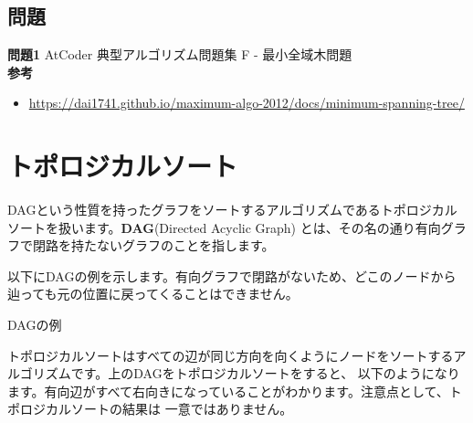 \subsection{問題}

\textbf{問題1} AtCoder 典型アルゴリズム問題集 F - 最小全域木問題\\

\textbf{参考}
\begin{itemize}
  \item \url{https://dai1741.github.io/maximum-algo-2012/docs/minimum-spanning-tree/}
\end{itemize}

\newpage

\section{トポロジカルソート}
DAGという性質を持ったグラフをソートするアルゴリズムであるトポロジカルソートを扱います。\textbf{DAG}(Directed Acyclic Graph)
とは、その名の通り有向グラフで閉路を持たないグラフのことを指します。

以下にDAGの例を示します。有向グラフで閉路がないため、どこのノードから辿っても元の位置に戻ってくることはできません。

\begin{center}
\end{center}

\begin{center}
  DAGの例
\end{center}

\vspace{0.5cm}

トポロジカルソートはすべての辺が同じ方向を向くようにノードをソートするアルゴリズムです。上のDAGをトポロジカルソートをすると、
以下のようになります。有向辺がすべて右向きになっていることがわかります。注意点として、トポロジカルソートの結果は
一意ではありません。

